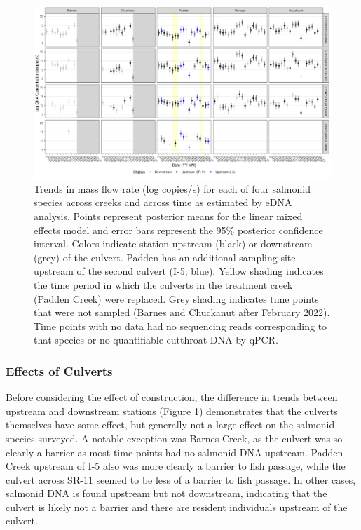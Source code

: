 \documentclass[
]{article}
\begin{document}
\begin{figure}
\centering
\includegraphics{../Output/Figures/multispeciesTrends_flowcorrected.png}
\caption{Trends in mass flow rate (log copies/s) for each of four
salmonid species across creeks and across time as estimated by eDNA
analysis. Points represent posterior means for the linear mixed effects
model and error bars represent the 95\% posterior confidence interval.
Colors indicate station upstream (black) or downstream (grey) of the
culvert. Padden has an additional sampling site upstream of the second
culvert (I-5; blue). Yellow shading indicates the time period in which
the culverts in the treatment creek (Padden Creek) were replaced. Grey
shading indicates time points that were not sampled (Barnes and
Chuckanut after February 2022). Time points with no data had no
sequencing reads corresponding to that species or no quantifiable
cutthroat DNA by qPCR.\label{fig:ts}}
\end{figure}

\hypertarget{effects-of-culverts}{%
\subsubsection{Effects of Culverts}\label{effects-of-culverts}}

Before considering the effect of construction, the difference in trends
between upstream and downstream stations (Figure \ref{fig:ts})
demonstrates that the culverts themselves have some effect, but
generally not a large effect on the salmonid species surveyed. A notable
exception was Barnes Creek, as the culvert was so clearly a barrier as
most time points had no salmonid DNA upstream. Padden Creek upstream of
I-5 also was more clearly a barrier to fish passage, while the culvert
across SR-11 seemed to be less of a barrier to fish passage. In other
cases, salmonid DNA is found upstream but not downstream, indicating
that the culvert is likely not a barrier and there are resident
individuals upstream of the culvert.
\end{document}
